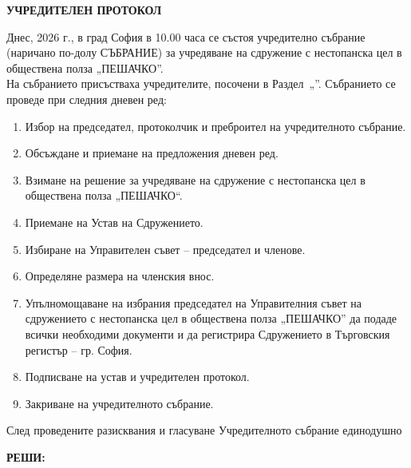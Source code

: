 \documentclass[11pt,a4paper]{article}
\begin{document}
\begin{center}
  {\bf\Huge УЧРЕДИТЕЛЕН ПРОТОКОЛ}
\end{center}

\vspace{0.7cm}

Днес, \makebox[3cm]{\dotfill} 2026 г., в град София в 10.00 часа се състоя учредително
събрание (наричано по-долу СЪБРАНИЕ) за учредяване на сдружение с нестопанска цел в
обществена полза „ПЕШАЧКО”. \\[0.2cm]

\noindent На събранието присъстваха учредителите, посочени в
Раздел~„”. Събранието се проведе при следния дневен ред:

\begin{enumerate}
\item Избор на председател, протоколчик и преброител на учредителното събрание.
\item Обсъждане и приемане на предложения дневен ред.
\item Взимане на решение за учредяване на сдружение с нестопанска цел в обществена полза
  „ПЕШАЧКО“.
\item Приемане на Устав на Сдружението.
\item Избиране на Управителен съвет -- председател и членове.
\item Определяне размера на членския внос.
\item Упълномощаване на избрания председател на Управителния съвет на сдружението с
  нестопанска цел в обществена полза „ПЕШАЧКО” да подаде всички необходими документи и
  да регистрира Сдружението в Търговския регистър -- гр. София.
\item Подписване на устав и учредителен протокол.
\item Закриване на учредителното събрание.
\end{enumerate}

След проведените разисквания и гласуване Учредителното събрание единодушно

\begin{center}
  {\bf\large РЕШИ:}
\end{center}
\end{document}
